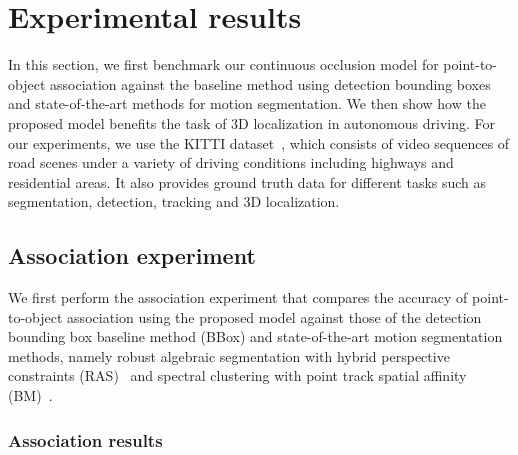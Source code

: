 \section{Experimental results}
\label{sec:experiments}

In this section, we first benchmark our continuous occlusion model for point-to-object association against the baseline method using detection bounding boxes and state-of-the-art methods for motion segmentation. We then show how the proposed model benefits the task of 3D localization in autonomous driving. For our experiments, we use the KITTI dataset~\cite{geiger2013vision}, which consists of video sequences of road scenes under a variety of driving conditions including highways and residential areas. It also provides ground truth data for different tasks such as segmentation, detection, tracking and 3D localization.



\subsection{Association experiment}

We first perform the association experiment that compares the accuracy of point-to-object association using the proposed model against those of the detection bounding box baseline method (BBox) and state-of-the-art motion segmentation methods, namely robust algebraic segmentation with hybrid perspective constraints (RAS)~\cite{Rao_etal_2010} and spectral clustering with point track spatial affinity (BM)~\cite{Brox_Malik_2010}.



\subsubsection{Association results}

